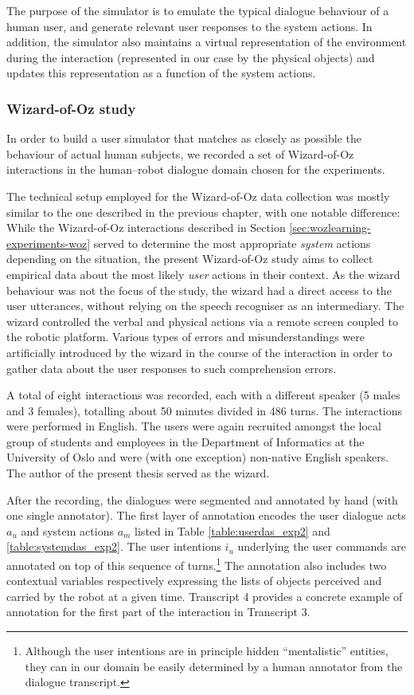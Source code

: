 The purpose of the simulator is to emulate the typical dialogue behaviour of a human user, and generate relevant user responses to the system actions.  In addition, the simulator also maintains a virtual representation of the environment during the interaction (represented in our case by the physical objects) and updates this representation as a function of the system actions.


\subsubsection*{Wizard-of-Oz study}

In order to build a user simulator that matches as closely as possible the behaviour of actual human subjects, we recorded a set of Wizard-of-Oz interactions in the human--robot dialogue domain chosen for the experiments. 

The technical setup employed for the Wizard-of-Oz data collection was mostly similar to the one described in the previous chapter, with one notable difference:  While the Wizard-of-Oz interactions described in Section \ref{sec:wozlearning-experiments-woz} served to determine the most appropriate \textit{system} actions depending on the situation, the present Wizard-of-Oz study aims to collect empirical data about the most likely \textit{user} actions in their context.  As the wizard behaviour was not the focus of the study, the wizard had a direct access to the user utterances, without relying on the speech recogniser as an intermediary. The wizard controlled the verbal and physical actions via a remote screen coupled to the robotic platform. Various types of errors and misunderstandings were artificially introduced by the wizard in the course of the interaction in order to gather data about the user responses to such comprehension errors. 

A total of eight interactions was recorded, each with a different speaker (5 males and 3 females), totalling about 50 minutes divided in 486 turns.  The interactions were performed in English. The users were again recruited amongst the local group of students and employees in the Department of Informatics at the University of Oslo and were (with one exception) non-native English speakers. The author of the present thesis served as the wizard. 

After the recording, the dialogues were segmented and annotated by hand (with one single annotator). The first layer of annotation encodes the user dialogue acts $a_u$ and system actions $a_m$ listed in Table \ref{table:userdas_exp2} and \ref{table:systemdas_exp2}. The user intentions $i_u$ underlying the user commands are annotated on top of this sequence of turns.\footnote{Although the user intentions are in principle hidden ``mentalistic'' entities, they can in our domain be easily determined by a human annotator from the dialogue transcript.} The annotation also includes two contextual variables respectively expressing the lists of objects perceived and carried by the robot at a given time. Transcript 4 provides a concrete example of annotation for the first part of the interaction in Transcript 3. 

